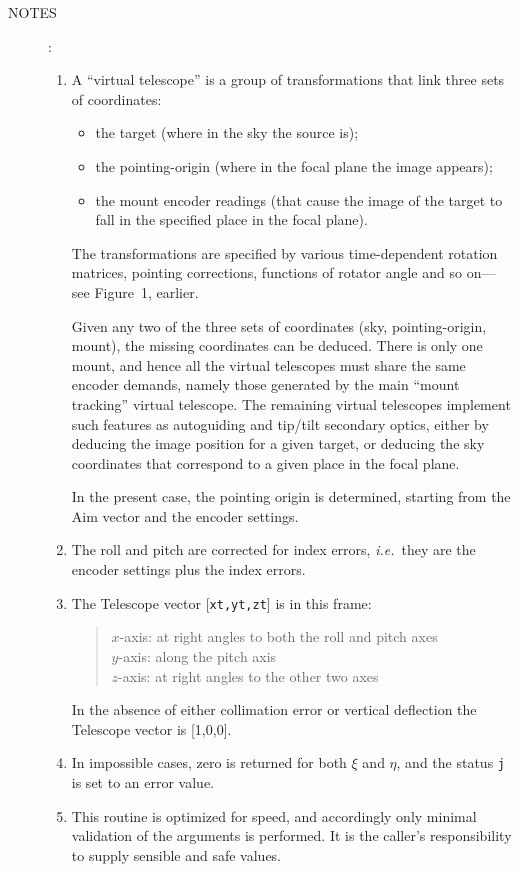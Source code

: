 \documentclass[12pt,fleqn,twoside]{article}
\renewcommand{\_}{{\tt\char'137}}     %
\newcommand{\notes}[1]
{
  \goodbreak
  \begin{description}
    \item[NOTES]: \nopagebreak
        #1
  \end{description}
  \vspace{-3ex}
}
\begin{document}
\notes{
\begin{enumerate}
\setlength{\parskip}{\medskipamount}
\item A ``virtual telescope'' is a group of transformations that link
      three sets of coordinates:
      \begin{itemize}
      \item the target (where in the sky the source is);
      \item the pointing-origin (where in the focal plane the image
            appears);
      \item the mount encoder readings (that cause the image of the
            target to fall in the specified place in the focal plane).
      \end{itemize}
      The transformations are specified by various time-dependent
      rotation matrices, pointing corrections, functions of rotator
      angle and so on---see Figure~1, earlier.

      Given any two of the three sets of coordinates (sky,
      pointing-origin, mount), the
      missing coordinates can be deduced.  There is
      only one mount, and hence all the virtual telescopes must share
      the same encoder demands, namely those generated by the main
      ``mount tracking'' virtual telescope.  The remaining virtual
      telescopes implement such features as autoguiding and tip/tilt
      secondary optics, either by deducing the image position for a
      given target, or deducing the sky coordinates that correspond to
      a given place in the focal plane.

      In the present case, the pointing origin is determined, starting
      from the {\sc Aim} vector and the encoder settings.
\item The roll and pitch are corrected for index errors,
      {\it i.e.}~they are the encoder settings plus the index errors.
\item The {\sc Telescope} vector [{\tt xt,yt,zt}] is in this frame:
      \begin{quote}
      $x$-axis:  at right angles to both the roll and pitch axes \\
      $y$-axis:  along the pitch axis \\
      $z$-axis:  at right angles to the other two axes
      \end{quote}
      In the absence of either collimation error or vertical deflection
      the {\sc Telescope} vector is [1,0,0].
\item In impossible cases, zero is returned for both $\xi$
      and $\eta$, and the status {\tt j} is set to an error value.
\item This routine is optimized for speed, and accordingly only minimal
      validation of the arguments is performed.  It is the caller's
      responsibility to supply sensible and safe values.
\end{enumerate}
}
\end{document}
